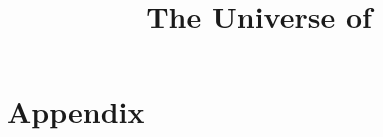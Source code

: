 \documentclass[a4paper,12pt,openany,oneside]{book}
\title{The Universe of \Miith}
\begin{document}
  \stuffatthebeginning
  
  
  
  \begin{comment}
    \part{The World of \Miith}
  \end{comment}
  
  
  
  
  
  
  \begin{comment}
    \part{The Characters of \Miith}
  \end{comment}
  \begin{comment}
    
    
  \end{comment}
  
  
  
  \begin{comment}
    \part{The Book Series of \Miith}
  \end{comment}
  \begin{comment}
    
    
    
    
  \end{comment}
  
  
  
  \part{Appendix}
  \appendix
  
  
  
  
  
  \begin{comment}
    
  \end{comment}
  
  
  
  
  \printindex
\end{document}
